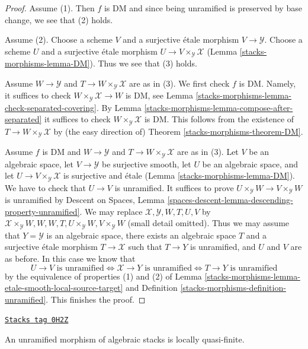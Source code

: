 \begin{proof}
Assume (1). Then $f$ is DM and since being unramified is preserved
by base change, we see that (2) holds.

\medskip\noindent
Assume (2). Choose a scheme $V$ and a surjective \'etale morphism
$V \to \mathcal{Y}$. Choose a scheme $U$ and a surjective \'etale morphism
$U \to V \times_\mathcal{Y} \mathcal{X}$ (Lemma \ref{stacks-morphisms-lemma-DM}).
Thus we see that (3) holds.

\medskip\noindent
Assume $W \to \mathcal{Y}$ and $T \to W \times_\mathcal{Y} \mathcal{X}$
are as in (3). We first check $f$ is DM. Namely, it suffices to check
$W \times_\mathcal{Y} \mathcal{X} \to W$ is DM, see
Lemma \ref{stacks-morphisms-lemma-check-separated-covering}.
By Lemma \ref{stacks-morphisms-lemma-compose-after-separated}
it suffices to check $W \times_\mathcal{Y} \mathcal{X}$ is DM.
This follows from the existence of $T \to W \times_\mathcal{Y} \mathcal{X}$
by (the easy direction of) Theorem \ref{stacks-morphisms-theorem-DM}.

\medskip\noindent
Assume $f$ is DM and $W \to \mathcal{Y}$ and
$T \to W \times_\mathcal{Y} \mathcal{X}$ are as in (3).
Let $V$ be an algebraic space, let $V \to \mathcal{Y}$ be surjective smooth,
let $U$ be an algebraic space, and let
$U \to V \times_\mathcal{Y} \mathcal{X}$ is surjective and \'etale
(Lemma \ref{stacks-morphisms-lemma-DM}). We have to check that $U \to V$ is unramified.
It suffices to prove $U \times_\mathcal{Y} W \to V \times_\mathcal{Y} W$
is unramified by Descent on Spaces, Lemma
\ref{spaces-descent-lemma-descending-property-unramified}.
We may replace $\mathcal{X}, \mathcal{Y}, W, T, U, V$ by
$\mathcal{X} \times_\mathcal{Y} W, W, W, T, U \times_\mathcal{Y} W,
V \times_\mathcal{Y} W$ (small detail omitted).
Thus we may assume that $Y = \mathcal{Y}$ is an algebraic space, there exists
an algebraic space $T$ and a surjective \'etale morphism
$T \to \mathcal{X}$ such that $T \to Y$ is unramified, and $U$ and $V$
are as before. In this case we know that
$$
U \to V\text{ is unramified}
\Leftrightarrow
\mathcal{X} \to Y\text{ is unramified}
\Leftrightarrow
T \to Y\text{ is unramified}
$$
by the equivalence of properties (1) and (2) of
Lemma \ref{stacks-morphisms-lemma-etale-smooth-local-source-target}
and Definition \ref{stacks-morphisms-definition-unramified}.
This finishes the proof.
\end{proof}

\begin{lemma}
\label{stacks-morphisms-lemma-unramified-quasi-finite}
\href{https://stacks.math.columbia.edu/tag/0H2Z}{\texttt{Stacks tag 0H2Z}}

An unramified morphism of algebraic stacks is locally quasi-finite.
\end{lemma}

